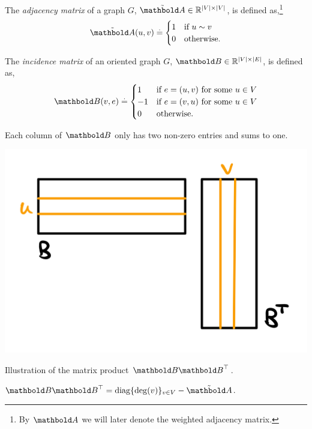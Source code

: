 \begin{defn}
The \emph{adjacency matrix} of a graph $G$, $\Tilde{\mA} \in \R^{|\sV|\times|\sV|}$, is defined as,\footnote{By $\mA$ we will later denote the weighted adjacency matrix.} \begin{align}
    \Tilde{\mA}(u, v) \defeq \begin{cases}
        1 & \text{if $u \sim v$} \\
        0 & \text{otherwise}.
    \end{cases}
\end{align}
\end{defn}
\begin{defn}
The \emph{incidence matrix} of an oriented graph $G$, $\mB \in \R^{|\sV|\times|\sE|}$, is defined as, \begin{align}
    \mB(v, e) \defeq \begin{cases}
        1 & \text{if $e = (u,v)$ for some $u \in \sV$} \\
        -1 & \text{if $e = (v,u)$ for some $u \in \sV$} \\
        0 & \text{otherwise}.
    \end{cases}
\end{align}
\end{defn} Each column of $\mB$ only has two non-zero entries and sums to one.
\begin{marginfigure}
    \includegraphics[width=\textwidth]{notes/figures/incidence_matrix.png}
    \caption{Illustration of the matrix product $\mB\trans{\mB}$.}
\end{marginfigure}
\begin{lem}\label{lem:incidence_matrix_product}
$\mB \trans{\mB} = \diag\{\deg(v)\}_{v \in \sV} - \Tilde{\mA}$.
\end{lem}
